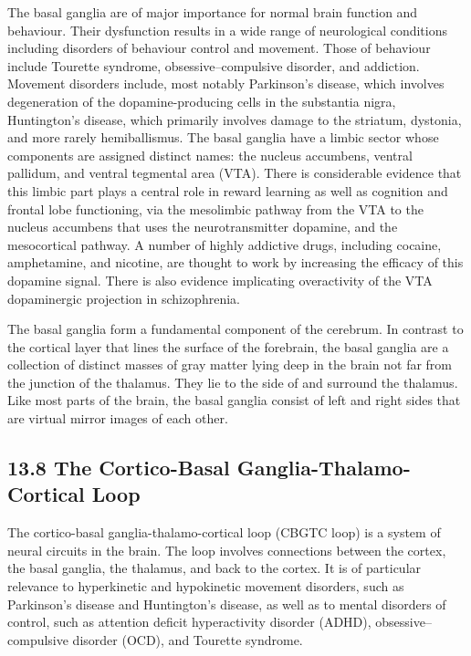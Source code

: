 The basal ganglia are of major importance for normal brain function and
behaviour. Their dysfunction results in a wide range of neurological
conditions including disorders of behaviour control and movement. Those
of behaviour include Tourette syndrome, obsessive--compulsive disorder,
and addiction. Movement disorders include, most notably Parkinson's
disease, which involves degeneration of the dopamine-producing cells in
the substantia nigra, Huntington's disease, which primarily involves
damage to the striatum, dystonia, and more rarely hemiballismus. The
basal ganglia have a limbic sector whose components are assigned
distinct names: the nucleus accumbens, ventral pallidum, and ventral
tegmental area (VTA). There is considerable evidence that this limbic
part plays a central role in reward learning as well as cognition and
frontal lobe functioning, via the mesolimbic pathway from the VTA to the
nucleus accumbens that uses the neurotransmitter dopamine, and the
mesocortical pathway. A number of highly addictive drugs, including
cocaine, amphetamine, and nicotine, are thought to work by increasing
the efficacy of this dopamine signal. There is also evidence implicating
overactivity of the VTA dopaminergic projection in schizophrenia.

The basal ganglia form a fundamental component of the cerebrum. In
contrast to the cortical layer that lines the surface of the forebrain,
the basal ganglia are a collection of distinct masses of gray matter
lying deep in the brain not far from the junction of the thalamus. They
lie to the side of and surround the thalamus. Like most parts of the
brain, the basal ganglia consist of left and right sides that are
virtual mirror images of each other.

\hypertarget{the-cortico-basal-ganglia-thalamo-cortical-loop}{%
\subsection{\texorpdfstring{{13.8} The Cortico-Basal
Ganglia-Thalamo-Cortical
Loop}{13.8 The Cortico-Basal Ganglia-Thalamo-Cortical Loop}}\label{the-cortico-basal-ganglia-thalamo-cortical-loop}}

The cortico-basal ganglia-thalamo-cortical loop (CBGTC loop) is a system
of neural circuits in the brain. The loop involves connections between
the cortex, the basal ganglia, the thalamus, and back to the cortex. It
is of particular relevance to hyperkinetic and hypokinetic movement
disorders, such as Parkinson's disease and Huntington's disease, as well
as to mental disorders of control, such as attention deficit
hyperactivity disorder (ADHD), obsessive--compulsive disorder (OCD), and
Tourette syndrome.

